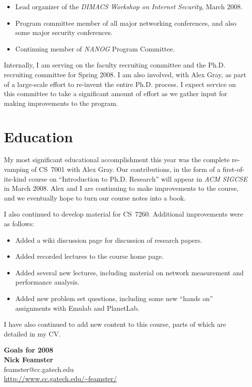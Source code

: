 \begin{sloppypar}
\begin{itemize}
\itemsep=-1pt
\item Lead organizer of the {\em DIMACS Workshop on Internet Security},
  March 2008.
\item Program committee member of all major networking conferences, and
  also some major security conferences.
\item Continuing member of {\em NANOG} Program Committee.
\end{itemize}

Internally, I am serving on the faculty recruiting committee and the
Ph.D. recruiting committee for Spring 2008.  I am also involved, with
Alex Gray, as part of a large-scale effort to re-invent the entire
Ph.D. process.  I expect service on this committee to take a significant
amount of effort as we gather input for making improvements to the program.

\section*{Education}

My most significant educational accomplishment this year was the
complete re-vamping of CS~7001 with Alex Gray.  Our contributions, in
the form of a first-of-its-kind course on ``Introduction to
Ph.D. Research'' will appear in {\em ACM SIGCSE} in March 2008.  Alex
and I are continuing to make improvements to the course, and we
eventually hope to turn our course notes into a book.

I also continued to develop material for CS~7260.  Additional
improvements were as follows:
\begin{itemize}
\itemsep=-1pt
\item Added a wiki discussion page for discussion of research papers.
\item Added recorded lectures to the course home page.
\item Added several new lectures, including material on network
  measurement and performance analysis.
\item Added new problem set questions, including some new ``hands on''
  assignments with Emulab and PlanetLab.
\end{itemize}
\noindent
I have also continued to add new content to this course, parts
of which are detailed in my CV.  

\newpage
\begin{center}
{\Large\textbf{Goals for 2008}}\\[.1in]
{\large\textbf{Nick Feamster}}\\[.05in]
feamster@cc.gatech.edu \\
\url{http://www.cc.gatech.edu/~feamster/} \\[.1in]
\end{center}


\end{sloppypar}
